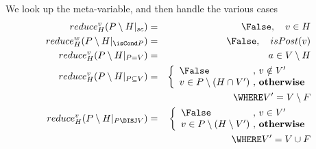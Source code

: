 We look up the meta-variable,
and then handle the various cases
\begin{eqnarray*}
  reduce^v_H (P \setminus H |_{sc})
  &=& \False, \quad v \in H
\\reduce^w_H (P \setminus H |_{\isCond P})
  &=& \False, \quad isPost(v)
\\reduce^v_H (P \setminus H |_{P = V})
  &=& a \in V \setminus H
\\reduce^v_H (P \setminus H |_{P \subseteq V})
  &=&
   \left\{\begin{array}{l@{~,~}l}
     \False & v \notin V' \\
     v \in P \setminus (H \cap V') & \textbf{otherwise}
   \end{array}\right.
\\ && \WHERE V' = V \setminus F
\\reduce^v_H (P \setminus H |_{P \DISJ V})
  &=&
   \left\{\begin{array}{l@{~,~}l}
     \False & v \in V' \\
     v \in P \setminus (H \setminus V') & \textbf{otherwise}
   \end{array}\right.
\\ && \WHERE V' = V \cup F
\end{eqnarray*} 
